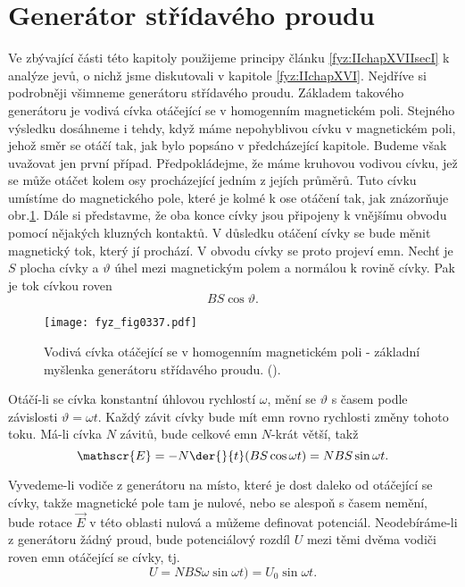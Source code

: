 \section{Generátor střídavého proudu}\label{fyz:IIchapXVIIsecV}
  Ve zbývající části této kapitoly použijeme principy článku \ref{fyz:IIchapXVIIsecI} k analýze 
  jevů, o nichž jsme diskutovali v kapitole \ref{fyz:IIchapXVI}. Nejdříve si podrobněji všimneme 
  generátoru střídavého proudu. Základem takového generátoru je vodivá cívka otáčející se v 
  homogenním magnetickém poli. Stejného výsledku dosáhneme i tehdy, když máme nepohyblivou cívku v 
  magnetickém poli, jehož směr se otáčí tak, jak bylo popsáno v předcházející kapitole. Budeme však 
  uvažovat jen první případ. Předpokládejme, že máme kruhovou vodivou cívku, jež se může otáčet 
  kolem osy procházející jedním z jejích průměrů. Tuto cívku umístíme do magnetického pole, které 
  je kolmé k ose otáčení tak, jak znázorňuje obr.\ref{fyz:fig0337}. Dále si představme, že oba konce 
  cívky jsou připojeny k vnějšímu obvodu pomocí nějakých kluzných kontaktů. V důsledku otáčení 
  cívky se bude měnit magnetický tok, který jí prochází. V obvodu cívky se proto projeví emn. Nechť 
  je \(S\) plocha cívky a \(\vartheta\) úhel mezi magnetickým polem a normálou k rovině cívky. Pak 
  je tok cívkou roven
  \begin{equation}\label{fyz:eq390}
    BS\cos\vartheta.
  \end{equation}
  
  \begin{figure}[ht!]  %
    \centering
    \texttt{[image: fyz\_fig0337.pdf]}
    \caption{Vodivá cívka otáčející se v homogenním magnetickém poli - základní myšlenka generátoru 
             střídavého proudu.
             (\cite[s.~301]{Feynman02}).}
    \label{fyz:fig0337}
  \end{figure}
  Otáčí-li se cívka konstantní úhlovou rychlostí \(\omega\), mění se \(\vartheta\) s časem podle 
  závislosti \(\vartheta = \omega t\). Každý závit cívky bude mít emn rovno rychlosti změny tohoto 
  toku. Má-li cívka \(N\) závitů, bude celkové emn \(N\)-krát větší, takž
  \begin{equation}\label{fyz:eq391}
    \mathscr{E} = - N\der{ }{t}(BS\cos\omega t)= NBS\sin\omega t.
  \end{equation}
  
  Vyvedeme-li vodiče z generátoru na místo, které je dost daleko od otáčející se cívky, takže 
  magnetické pole tam je nulové, nebo se alespoň s časem nemění, bude rotace \(\vec{E}\) v této 
  oblasti nulová a můžeme definovat potenciál. Neodebíráme-li z generátoru žádný proud, bude 
  potenciálový rozdíl \(U\) mezi těmi dvěma vodiči roven emn otáčející se cívky, tj.
  \begin{equation}\label{fyz:eq392}
    U = NBS\omega\sin\omega t)= U_0\sin\omega t.
  \end{equation}
  

